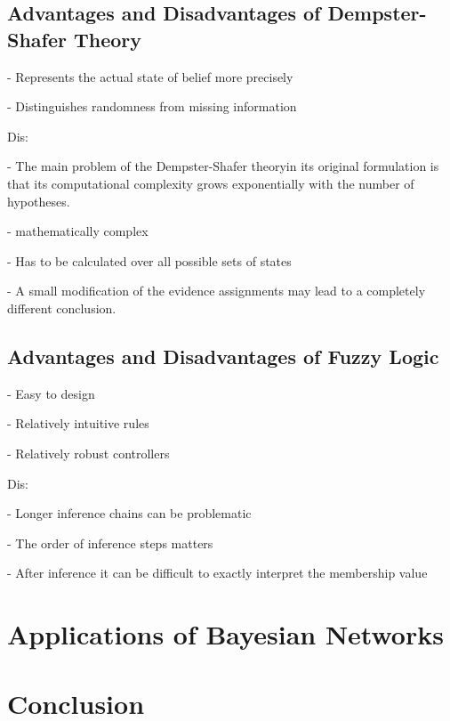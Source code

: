 \documentclass[11pt]{article}
\begin{document}
\subsection{Advantages and Disadvantages of Dempster-Shafer Theory}

- Represents the actual state of belief more precisely

- Distinguishes randomness from missing information

Dis:

- The main problem of the Dempster-Shafer theoryin its original formulation is
that its computational complexity grows exponentially with the number of
hypotheses.

- mathematically complex

- Has to be calculated over all possible sets of states

- A small modification of the evidence assignments may lead to a completely
different conclusion.

\subsection{Advantages and Disadvantages of Fuzzy Logic}

- Easy to design 

- Relatively intuitive rules 

- Relatively robust controllers 

Dis:

- Longer inference chains can be problematic 

- The order of inference steps matters

- After inference it can be difficult to exactly interpret the membership value 


\section{Applications of Bayesian Networks}

\section{Conclusion}



\end{document}
